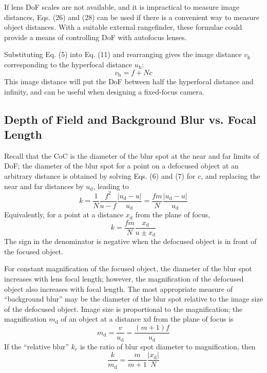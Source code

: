 \documentclass[11pt, oneside]{scrartcl}   	%
\begin{document}
If lens DoF scales are not available, and it is impractical to measure image distances, Eqs. (26) and (28) can be used if there is a convenient way to measure object distances. With a suitable external rangefinder, these formulae could provide a means of controlling DoF with autofocus lenses.

Substituting Eq. (5) into Eq. (11) and rearranging gives the image distance $v_\mathrm{h}$ corresponding to the hyperfocal distance $u_\mathrm{h}$:
\begin{equation}
   v_\mathrm{h} = f + N\!c
   \label{eq:vh} 
\end{equation}
This image distance will put the DoF between half the hyperfocal distance and infinity, and
can be useful when designing a fixed-focus camera.

\subsection{Depth of Field and Background Blur vs. Focal Length}

Recall that the CoC is the diameter of the blur spot at the near and far limits of DoF; the diameter of the blur spot for a point on a defocused object at an arbitrary distance is obtained by solving Eqs. (6) and (7) for $c$, and replacing the near and far distances by $u_\mathrm{d}$, leading to
\begin{equation}
   k = \frac1N \frac{f^2}{u-f}  \frac{|u_\mathrm{d} - u|}{u_\mathrm{d}} = \frac{fm}N \frac{|u_\mathrm{d} - u|}{u_\mathrm{d}}
   \label{eq:k1}
\end{equation}
Equivalently, for a point at a distance $x_\mathrm{d}$ from the plane of focus, 
\begin{equation}
   k = \frac{fm}N \frac{x_\mathrm{d}}{u\pm x_\mathrm{d}}
   \label{eq:k2}
\end{equation}
 The sign in the denominator is negative when the defocused object is in front of the focused object.

For constant magnification of the focused object, the diameter of the blur spot increases with lens focal length; however, the magnification of the defocused object also increases with focal length. The most appropriate measure of “background blur” may be the diameter of the blur spot relative to the image size of the defocused object. Image size is proportional to the magnification; the magnification $m_\mathrm{d}$ of an object at a distance xd from the plane of focus is
\begin{equation}
   m_\mathrm{d} = \frac v {u_\mathrm{d}} = \frac{(m+1)f}{u_\mathrm{d}} 
   \label{eq:md}
\end{equation}
If the “relative blur” $k_r$ is the ratio of blur spot diameter to magnification, then
\begin{equation}
    \frac{k}{m_\mathrm{d}} = \frac m{m+1}\frac{|x_\mathrm{d}|}N
    \label{eq:km}
\end{equation}
\end{document}
